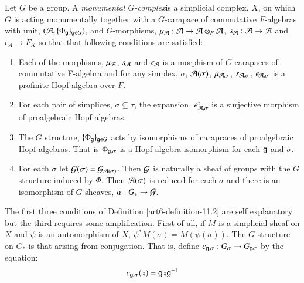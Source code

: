 \begin{definition}\label{art6-definition-11.2}
Let $G$ be a group. A \textit{monumental $G$-complex}is a simplicial complex, $X$, on which $G$ is acting monumentally together with a $G$-carapace of commutative $F$-algebras with unit, $(\mathcal{A}, \{\Phi_{\mathsf{g}}\}_{\mathsf{g} \in G})$, and $G$-morphisms, $\mu_{\mathcal{A}} : \mathcal{A} \rightarrow \mathcal{A} \otimes_{F} \mathcal{A}$, $s_{\mathcal{A}} : \mathcal{A} \rightarrow \mathcal{A}$ and $\epsilon_{A} \rightarrow F_{X}$ so that that following conditions are satisfied:
\begin{enumerate}[{\rm(1)}]
\item Each of the morphisms, $\mu_{\mathcal{A}}$, $s_{\mathcal{A}}$ and $\epsilon_{\mathcal{A}}$ is a morphism of $G$-carapaces of commutative F-algebra and for any simplex, $\sigma$, $\mathcal{A}(\sigma)$, $\mu_{\mathcal{A}, \sigma}$, $s_{\mathcal{A}, \sigma}$, $\epsilon_{\mathcal{A}, \sigma}$ is a profinite Hopf algebra over $F$.\label{art6-definition11.2-enum-1}

\item For each pair of simplices, $\sigma \subseteq \tau$, the expansion, $e_{\mathcal{A}, \sigma}^{\tau}$ is a surjective morphism of proalgebraic Hopf algebras.\label{art6-definition11.2-enum-2}

\item The $G$ structure, $\{\Phi_{\mathsf{g}}\}_{\mathsf{g} \in G}$ acts by isomorphisms of carapraces of proalgebraic Hopf algebras. That is $\Phi_{\mathsf{g}, \sigma}$ is a Hopf algebra isomorphism for each $\mathsf{g}$ and $\sigma$.\label{art6-definition11.2-enum-3}

\item For each $\sigma$ let $\mathcal{G}(\sigma) =\mathcal{G}_{\mathcal{A}(\sigma)}$. Then $\mathcal{G}$ is naturally a sheaf of groups with the $G$ structure induced by $\Phi$. Then $\mathcal{A}(\sigma)$ is reduced for each $\sigma$ and there is an isomorphism of $G$-sheaves, $\alpha : G_{*} \rightarrow \mathcal{G}$.\label{art6-definition11.2-enum-4}
\end{enumerate}
\end{definition}

The first three conditions of Definition \ref{art6-definition-11.2} are self explanatory but the third requires some amplification. First of all, if $M$ is a simplicial sheaf on $X$ and $\psi$ is an automorphism of $X$, $\psi^{*}M(\sigma) = M(\psi(\sigma))$. The $G$-structure on $G_{*}$ is that arising from conjugation. That is, define $c_{\mathsf{g}, \sigma} : G_{\sigma} \rightarrow G_{\mathsf{g} \sigma}$ by the equation:
\begin{equation}\label{art6-eq-11.3}
c_{\mathsf{g},\sigma}(x) = \mathsf{g} x \mathsf{g}^{-1}
\end{equation}


